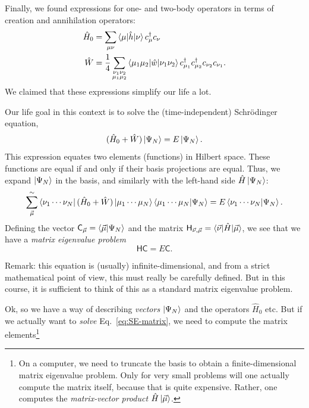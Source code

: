 \documentclass{report}
\theoremstyle{plain}
\theoremstyle{definition}
\begin{document}
Finally, we found expressions for one- and two-body operators in terms
of creation and annihilation operators:
\begin{align}
  \hat{H}_0 &= \sum_{\mu\nu} \braket{\mu|\hat{h}|\nu} c^\dag_\mu c_\nu
  \\
  \hat{W} &= \frac{1}{4} \sum_{\substack{\nu_1\nu_2\\\mu_1\mu_2}}
  \braket{\mu_1\mu_2|\hat{w}|\nu_1\nu_2} c^\dag_{\mu_1} c^\dag_{\mu_2}
  c_{\nu_2} c_{\nu_1}.
\end{align}
We claimed that these expressions simplify our life a lot. 

Our life goal in this context is to solve the (time-independent)
Schr\"odinger equation,
\begin{equation}
  (\hat{H}_0 + \hat{W})\ket{\Psi_N} = E \ket{\Psi_N}.
\end{equation}
This expression equates two elements (functions) in Hilbert
space. These functions are equal if and only if their basis
projections are equal. Thus, we expand $\ket{\Psi_N}$ in the basis,
and similarly with the left-hand side $\hat{H}\ket{\Psi_N}$:
\begin{equation}
  \sum_{\vec{\mu}}^\sim \bra{\nu_1\cdots\nu_N} (\hat{H}_0 + \hat{W})
  \ket{\mu_1\cdots \mu_N} \braket{\mu_1\cdots\mu_N|\Psi_N} = E \braket{\nu_1\cdots\nu_N|\Psi_N}.
\end{equation}
Defining the vector $\mathsf{C}_{\vec{\mu}} = \braket{\vec{\mu}|\Psi_N}$ and
the matrix $\mathsf{H}_{\vec{\nu},\vec{\mu}} =
\braket{\vec{\nu}|\hat{H}|\vec{\mu}}$, we see that we have a
\emph{matrix eigenvalue problem}
\begin{equation}
  \mathsf{H}\mathsf{C} = E\mathsf{C}. \label{eq:SE-matrix}
\end{equation}

Remark: this equation is (usually) infinite-dimensional, and from a strict
mathematical point of view, this must really be carefully defined. But
in this course, it is sufficient to think of this as a standard matrix
eigenvalue problem.

Ok, so we have a way of describing \emph{vectors} $\ket{\Psi_N}$ and
the operators $\hat{H}_0$ etc. But if we actually want to \emph{solve}
Eq.~\eqref{eq:SE-matrix}, we need to compute the matrix
elements\footnote{On a computer, we need to truncate the basis to
  obtain a finite-dimensional matrix eigenvalue problem. Only for very
  small problems will one actually compute the matrix itself, because
  that is quite expensive. Rather, one computes the
  \emph{matrix-vector product} $\hat{H}\ket{\vec{\mu}}$.}
\end{document}
